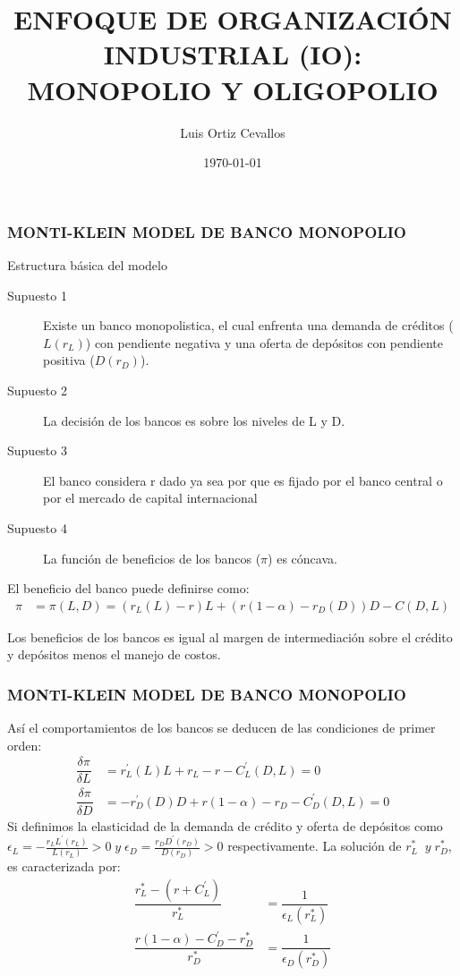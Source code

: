 \documentclass[10pt, xcolor=table, x11names]{beamer}
\title[]{ENFOQUE DE ORGANIZACIÓN INDUSTRIAL (IO): MONOPOLIO Y OLIGOPOLIO}
\author[Luis Ortiz]{Luis Ortiz Cevallos}
\institute[SECMCA]{\bf SECMCA}
\date[\today]{\footnotesize \today}
\begin{document}
\begin{frame}
\titlepage
\end{frame}


\begin{frame}
    \frametitle{{\normalsize MONTI-KLEIN MODEL DE BANCO MONOPOLIO} {}}
    
    \begin{block} {Estructura básica del modelo}
        \begin{description}
            \item[Supuesto 1]  Existe un banco monopolistica, el cual enfrenta una demanda de créditos ($L(r_{L})$) con pendiente negativa y una oferta de depósitos con pendiente positiva ($D(r_{D})$).
            \item[Supuesto 2] La decisión de los bancos es sobre los niveles de L y D.
            \item[Supuesto 3] El banco considera r dado ya sea por que es fijado por el banco central o por el mercado de capital internacional  
            \item[Supuesto 4] La función de beneficios de los bancos ($\pi $) es cóncava.     
        \end{description}
        
    \end{block}	
    
    
    El beneficio del banco puede definirse como:
    \begin{align}
    \pi&=\pi(L, D)=(r_{L}(L)-r)L+(r(1-\alpha)-r_{D}(D))D-C(D,L) 
    \end{align}   
    
    Los beneficios de los bancos es igual al margen de intermediación sobre el crédito y depósitos menos el manejo de costos. 
\end{frame}

\begin{frame}
    \frametitle{{\normalsize MONTI-KLEIN MODEL DE BANCO MONOPOLIO} {}}
    
    Así el comportamientos de los bancos se deducen de las condiciones de primer orden:
    \begin{align}
    \dfrac{\delta \pi}{\delta L}&=r_{L}^{'}(L)L+r_{L}-r-C_{L}^{'}(D,L)=0  \\
    \dfrac{\delta \pi}{\delta D}&=-r_{D}^{'}(D)D+r(1-\alpha)-r_{D}-C_{D}^{'}(D,L)=0  
    \end{align} 
    Si definimos la elasticidad de la demanda de crédito y oferta de depósitos como $\epsilon_{L}=-\frac{r_{L}L^{'}(r_{L})}{L(r_{L})}>0   \; y \; \epsilon_{D}=\frac{r_{D}D^{'}(r_{D})}{D(r_{D})}>0$
    respectivamente. La solución de $r_{L}^{*}\; \; y \; r_{D}^{*}$, es caracterizada por:
    \begin{align}
    \dfrac{r_{L}^{*}-(r+C_{L}^{'})}{r_{L}^{*}}&=\dfrac{1}{\epsilon_{L}(r_{L}^{*})}  \\
    \dfrac{r(1-\alpha)-C_{D}^{'}-r_{D}^{*}}{r_{D}^{*}}&=\dfrac{1}{\epsilon_{D}(r_{D}^{*})}  
    \end{align} 
    
    
    
\end{frame}
\end{document}
